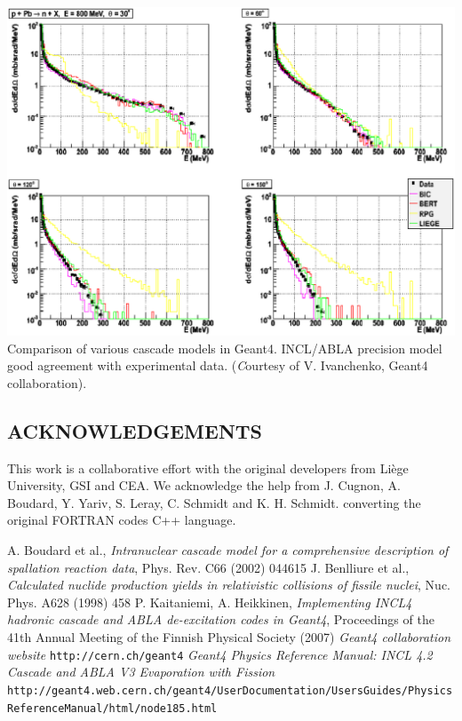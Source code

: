 \documentclass[20pt]{article}
\newenvironment{textbox}
{\begin{lrbox}{\dummybox}\begin{minipage}{0.9\columnwidth}}
{\end{minipage}\end{lrbox}\raisebox{-\depth}{\psshadowbox[framesep=1em,framearc=.1,shadow=true]{\usebox{\dummybox}}}\vspace{0.005\textheight}}
\begin{document}
\begin{center}
\begin{multicols}{3}
\includegraphics[scale=0.45]{images/vladimir.eps}
{\Large {\sf Comparison of various cascade models in Geant4. INCL/ABLA precision
model good agreement with experimental data. ({\emph Courtesy of
    V. Ivanchenko, Geant4 collaboration}).}}

\begin{textbox}


\section*{{\Huge {\sf ACKNOWLEDGEMENTS}}}

This work is a collaborative effort with the original developers from
Li\`ege University, GSI and CEA. We acknowledge the help from J. Cugnon,
A. Boudard, Y. Yariv, S. Leray, C. Schmidt and K. H. Schmidt.
converting the original FORTRAN codes C++ language.

\end{textbox}
\vskip2cm
\begin{textbox}

{\large
{}
\begin{thebibliography}{9}
 A. Boudard et al., \emph{Intranuclear cascade model for
    a comprehensive description of spallation reaction data}, Phys.
  Rev. C66 (2002) 044615
 J. Benlliure et al., \emph{Calculated nuclide
    production yields in relativistic collisions of fissile nuclei},
  Nuc. Phys. A628 (1998) 458
 P. Kaitaniemi, A. Heikkinen, \emph{Implementing INCL4
    hadronic cascade and ABLA de-excitation codes in Geant4},
  Proceedings of the 41th Annual Meeting of the Finnish Physical
  Society (2007)
 \emph{Geant4 collaboration website} {\tt http://\-cern.ch/\-geant4}
 \emph{Geant4 Physics Reference Manual: INCL 4.2 Cascade and ABLA V3 Evaporation with Fission} {\tt http://geant4.web.cern.ch/\-geant4/\-UserDocumentation/\-UsersGuides/\-PhysicsReferenceManual/\-html/\-node185.html}
%
%
\end{thebibliography}
}


\end{textbox}
\end{multicols}
\end{center}
\end{document}
